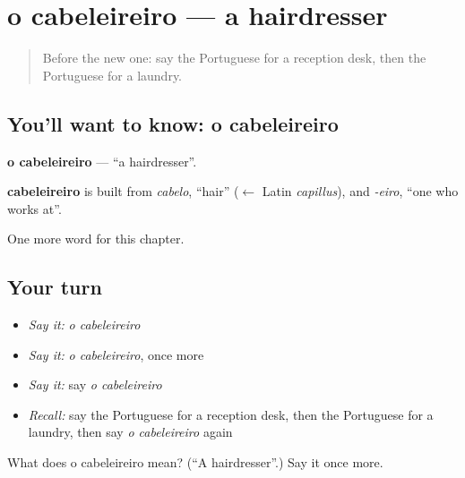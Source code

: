 \section[o cabeleireiro]{o cabeleireiro — a hairdresser}

\label{lesson:PT-C197-cabeleireiro}



\begin{quote}
Before the new one: say the Portuguese for a reception desk, then the Portuguese for a laundry.
\end{quote}

\subsection*{You'll want to know: o cabeleireiro}
\textbf{o cabeleireiro} — \textquotedblleft{}a hairdresser\textquotedblright{}.

\begin{cousinweb}
\textbf{cabeleireiro} is built from \emph{cabelo}, \textquotedblleft{}hair\textquotedblright{} ($\leftarrow$ Latin \emph{capillus}), and \emph{-eiro}, \textquotedblleft{}one who works at\textquotedblright{}.
\end{cousinweb}

\begin{grammarlens}[title={What you've built}]
One more word for this chapter.
\end{grammarlens}

\subsection*{Your turn}
\begin{itemize}
\raggedright
  \item \emph{Say it:} \emph{o cabeleireiro}
  \item \emph{Say it:} \emph{o cabeleireiro}, once more
  \item \emph{Say it:} say \emph{o cabeleireiro}
  \item \emph{Recall:} say the Portuguese for a reception desk, then the Portuguese for a laundry, then say \emph{o cabeleireiro} again
\end{itemize}

\begin{tcolorbox}[breakable,colback=teal!4,colframe=teal!35!black,title={Before you move on}]
What does o cabeleireiro mean? (\textquotedblleft{}A hairdresser\textquotedblright{}.) Say it once more.
\end{tcolorbox}
